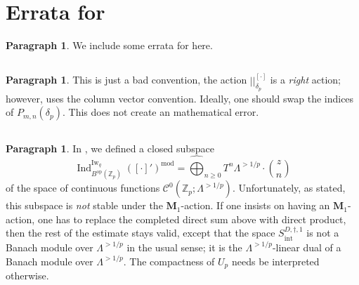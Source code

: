 \documentclass[12pt]{amsart}
\theoremstyle{definition}
\newtheorem{para}[subsection]{Paragraph}
\numberwithin{equation}{subsection}
\def\calC{\mathcal{C}}
\def\ZZ{\mathbb{Z}}
\def\bfM{\mathbf{M}}
\newcommand{\op}{\mathrm{op}}
\newcommand{\Iw}{\mathrm{Iw}}
\DeclareMathOperator{\Ind}{Ind}
\begin{document}
\section{Errata for \cite{liu-wan-xiao}}
\begin{para}
\label{P:para_179}
We include some errata for \cite{liu-wan-xiao} here.
\end{para}

\subsection{\cite[Proposition~3.4]{liu-wan-xiao}}
\begin{para}
\label{P:para_180}
This is just a bad convention, the action $||_{\delta_p}^{[\cdot]}$ is a \emph{right} action; however, \cite[Proposition~3.4]{liu-wan-xiao} uses the column vector convention.  Ideally, one should swap the indices of $P_{m,n}(\delta_p)$. This does not create an mathematical error.
\end{para}

\subsection{\cite[\S\,5.4]{liu-wan-xiao}} 
\label{ASS:errata integral model}
\begin{para}
\label{P:para_181}
In \cite[(5.4.1)]{liu-wan-xiao}, we defined a closed subspace
$$
\Ind_{B^\op(\ZZ_p)}^{\Iw_q}([\cdot]')^{\mathrm{mod}} = \widehat{\bigoplus}_{n \geq 0} T^n \Lambda^{>1/p}\cdot \binom zn
$$
of the space of continuous functions $\calC^0(\ZZ_p; \Lambda^{>1/p})$.
Unfortunately, as stated, this subspace is \emph{not} stable under the $\bfM_1$-action. If one insists on having an $\bfM_1$-action, one has to replace the completed direct sum above with direct product, then the rest of the estimate stays valid, except that the space $S_{\mathrm{int}}^{D, \dagger, 1}$ is not a Banach module over $\Lambda^{>1/p}$ in the usual sense; it is the $\Lambda^{>1/p}$-linear dual of a Banach module over $\Lambda^{>1/p}$. The compactness of $U_p$ needs be interpreted otherwise.
\end{para}
\end{document}

